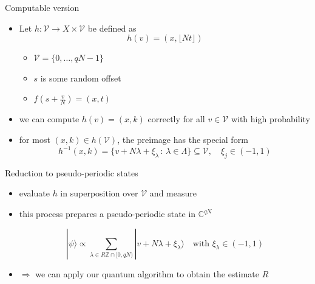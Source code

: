 \documentclass[slideColor]{prosper}
\newcommand{\C}{\mathbb C}
\renewcommand{\>}{\rangle}
\newcommand{\<}{\langle}
\begin{document}

\begin{slide}{Computable version}

\vspace{-0.3cm}
\begin{itemize}
\item Let $h : \mathcal{V} \rightarrow X \times \mathcal{V}$ be defined as
\[
h(v) = (x,\lfloor N t \rfloor)
\]

\begin{itemize}
\item $\mathcal{V}=\{0,\ldots,qN-1\}$

\medskip
\item $s$ is some random offset 

\medskip
\item $f(s+\tfrac{v}{N}) = (x,t)$
\end{itemize}

\medskip
\item we can compute $h(v)=(x,k)$ correctly for all $v\in \mathcal{V}$ with high probability

\medskip
\item for most $(x,k)\in h(\mathcal{V})$, the preimage has the special form
\[
h^{-1}(x,k) = \{ v + N \lambda + \xi_\lambda \, : \, \lambda\in\Lambda \} \subseteq \mathcal{V}, \quad \xi_j\in (-1,1) 
\]
\end{itemize}

\end{slide}


\begin{slide}{Reduction to pseudo-periodic states}

\begin{itemize}

\item evaluate $h$ in superposition over $\mathcal{V}$ and measure

\medskip
\item this process prepares a pseudo-periodic state in $\C^{qN}$

\[
|\psi\> \propto \sum_{\lambda\in R\mathbb{Z} \cap [0,qN)} 
| v + N \lambda + \xi_\lambda \> \quad\mbox{with $\xi_\lambda\in (-1,1)$}
\]

\medskip
\item $\Rightarrow$ we can apply our quantum algorithm to obtain the estimate $\hat{R}$
 
\end{itemize}

\end{slide}
\end{document}
